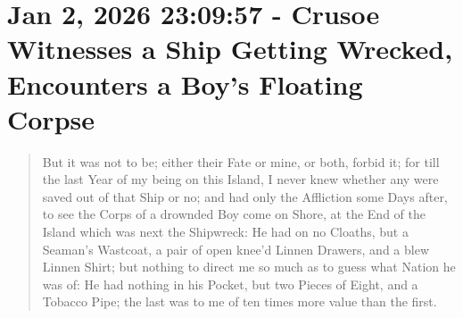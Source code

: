\documentclass[a4paper]{article}
\begin{document}
\section{Jan 2, 2026 23:09:57 - Crusoe Witnesses a Ship Getting Wrecked, Encounters a Boy's Floating Corpse}
\label{SEC47}



\noindent
\begin{minipage}{1\textwidth}
\vspace{1em}
\begin{quotation}
{\ttfamily


But it was not to be; either their Fate or mine, or both, forbid it; for till the last Year of my being on this Island, I never knew whether any were saved out of that Ship or no; and had only the Affliction some Days after, to see the Corps of a drownded Boy come on Shore, at the End of the Island which was next the Shipwreck: He had on no Cloaths, but a Seaman’s Wastcoat, a pair of open knee’d Linnen Drawers, and a blew Linnen Shirt; but nothing to direct me so much as to guess what Nation he was of: He had nothing in his Pocket, but two Pieces of Eight, and a Tobacco Pipe; the last was to me of ten times more value than the first.



}
\end{quotation}
\vspace{1em}
\end{minipage}
\end{document}
